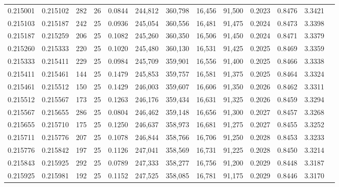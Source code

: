 \begin{tabular}{rrrrrrrrrrrrr}
0.215001 & 0.215102 &   282 &  26 &                                     0.0844 & 244,812 & 360,798 &  16,456 &  91,500 & 0.2023 & 0.8476 & 3.3421 \\
0.215103 & 0.215187 &   242 &  25 &                                     0.0936 & 245,054 & 360,556 &  16,481 &  91,475 & 0.2024 & 0.8473 & 3.3398 \\
0.215187 & 0.215259 &   206 &  25 &                                     0.1082 & 245,260 & 360,350 &  16,506 &  91,450 & 0.2024 & 0.8471 & 3.3379 \\
0.215260 & 0.215333 &   220 &  25 &                                     0.1020 & 245,480 & 360,130 &  16,531 &  91,425 & 0.2025 & 0.8469 & 3.3359 \\
0.215333 & 0.215411 &   229 &  25 &                                     0.0984 & 245,709 & 359,901 &  16,556 &  91,400 & 0.2025 & 0.8466 & 3.3338 \\
0.215411 & 0.215461 &   144 &  25 &                                     0.1479 & 245,853 & 359,757 &  16,581 &  91,375 & 0.2025 & 0.8464 & 3.3324 \\
0.215461 & 0.215512 &   150 &  25 &                                     0.1429 & 246,003 & 359,607 &  16,606 &  91,350 & 0.2026 & 0.8462 & 3.3311 \\
0.215512 & 0.215567 &   173 &  25 &                                     0.1263 & 246,176 & 359,434 &  16,631 &  91,325 & 0.2026 & 0.8459 & 3.3294 \\
0.215567 & 0.215655 &   286 &  25 &                                     0.0804 & 246,462 & 359,148 &  16,656 &  91,300 & 0.2027 & 0.8457 & 3.3268 \\
0.215655 & 0.215710 &   175 &  25 &                                     0.1250 & 246,637 & 358,973 &  16,681 &  91,275 & 0.2027 & 0.8455 & 3.3252 \\
0.215711 & 0.215776 &   207 &  25 &                                     0.1078 & 246,844 & 358,766 &  16,706 &  91,250 & 0.2028 & 0.8453 & 3.3233 \\
0.215776 & 0.215842 &   197 &  25 &                                     0.1126 & 247,041 & 358,569 &  16,731 &  91,225 & 0.2028 & 0.8450 & 3.3214 \\
0.215843 & 0.215925 &   292 &  25 &                                     0.0789 & 247,333 & 358,277 &  16,756 &  91,200 & 0.2029 & 0.8448 & 3.3187 \\
0.215925 & 0.215981 &   192 &  25 &                                     0.1152 & 247,525 & 358,085 &  16,781 &  91,175 & 0.2029 & 0.8446 & 3.3170 \\

\end{tabular}
